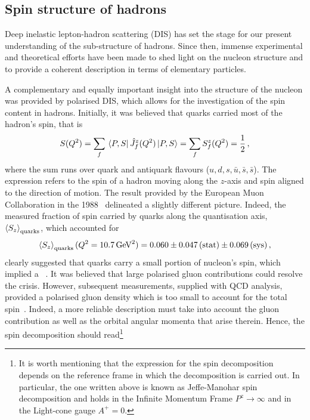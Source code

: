 \subsection*{Spin structure of hadrons}

Deep inelastic lepton-hadron scattering (DIS) has set the stage for our present understanding of the sub-structure of hadrons. Since then, immense experimental and theoretical efforts have been made to shed light on the nucleon structure and to provide a coherent description in terms of elementary particles.%

A complementary and equally important insight into the structure of the nucleon was provided by polarised DIS, which allows for the investigation of the spin content in hadrons. Initially, it was believed that quarks carried most of the hadron's spin, that is
\begin{equation}
  S(Q^2) = \sum_{f} \bra*{P,S} \hat{J}_f^z(Q^2) \ket*{P,S} = \sum_f S^z_f (Q^2) = \frac{1}{2} \,,
\end{equation}
%
where the sum runs over quark and antiquark flavours ($u,d,s,\bar{u}, \bar{s}, \bar{s}$). The expression refers to the spin of a hadron moving along the $z$-axis and spin aligned to the direction of motion. The result provided by the European Muon Collaboration in the 1988~\cite{EuropeanMuon:1989yki} delineated a slightly different picture. Indeed, the measured fraction of spin carried by quarks along the quantisation axis, $\left< S_z \right>_{\textrm{quarks}}$, which accounted for
\begin{equation}
  \left< S_z \right>_{\textrm{quarks}} (Q^2 = 10.7 \, \textrm{GeV}^2) = 0.060 \pm 0.047 \, (\textrm{stat}) \pm 0.069 \, (\textrm{sys}) \,,
\end{equation}
clearly suggested that quarks carry a small portion of nucleon's spin, which implied a ~\cite{Leader_Anselmino}. It was believed that large polarised gluon contributions could resolve the crisis. However, subsequent measurements, supplied with QCD analysis, provided a polarised gluon density which is too small to account for the total spin~\cite{Leader:2005ci}. Indeed, a more reliable description must take into account the gluon contribution as well as the orbital angular momenta that arise therein. Hence, the spin decomposition should read\footnote{\footnotesize It is worth mentioning that the expression for the spin decomposition depends on the reference frame in which the decomposition is carried out. In particular, the one written above is known as Jeffe-Manohar spin decomposition and holds in the Infinite Momentum Frame $P^z \rightarrow \infty$ and in the Light-cone gauge $A^+=0$.}
